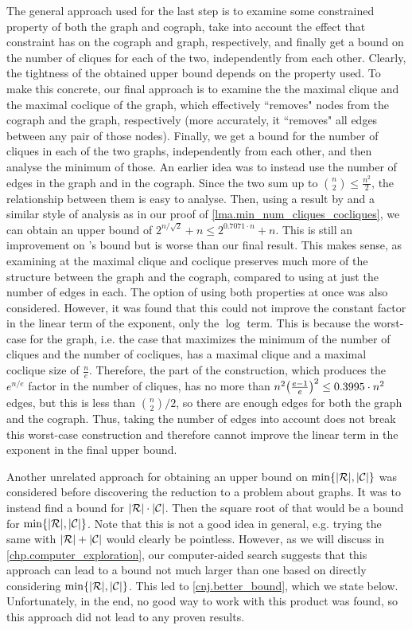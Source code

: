 \documentclass{report}
\DeclarePairedDelimiter{\set}{\{}{\}}
\DeclarePairedDelimiter{\abs}{\lvert}{\rvert}
\DeclarePairedDelimiter{\bracks}{(}{)}
\theoremstyle{definition}
\begin{document}
The general approach used for the last step is to examine some constrained property
of both the graph and cograph, take into account the effect that constraint has
on the cograph and graph, respectively, and finally get a bound on the number of
cliques for each of the two, independently from each other. Clearly, the tightness
of the obtained upper bound depends on the property used. To make this concrete,
our final approach is to examine the the maximal clique and the maximal coclique
of the graph, which effectively ``removes" nodes from the cograph and the graph,
respectively (more accurately, it ``removes" all edges between any pair of those
nodes). Finally, we get a bound for the number of cliques in each of the two graphs,
independently from each other, and then analyse the minimum of those.
An earlier idea was to instead use the number of edges in the graph and in the
cograph. Since the two sum up to $\binom{n}{2} \leq \frac{n^2}{2}$, the relationship
between them is easy to analyse. Then, using a result by \cite{cliques_edges} and a
similar style of analysis as in our proof of \cref{lma.min_num_cliques_cocliques},
we can obtain an upper bound of $2^{n / \sqrt{2}} + n \leq 2^{0.7071 \cdot n} + n$.
This is still an improvement on \cite{UFA_UB}'s bound but is worse than our final
result. This makes sense, as examining at the maximal clique and coclique preserves
much more of the structure between the graph and the cograph, compared to using
at just the number of edges in each. The option of using both properties at once
was also considered. However, it was found that this could not improve the constant
factor in the linear term of the exponent, only the $\log$ term. This is because
the worst-case for the graph, i.e. the case that maximizes the minimum of the number
of cliques and the number of cocliques, has a maximal clique and a maximal coclique
size of $\frac{n}{e}$. Therefore, the part of the construction, which produces the
$e^{n / e}$ factor in the number of cliques, has no more than
$n^2 \bracks*{\frac{e - 1}{e}}^2 \leq 0.3995 \cdot n^2$ edges, but this is less than
$\binom{n}{2} / 2$, so there are enough edges for both the graph and the cograph.
Thus, taking the number of edges into account does not break this worst-case
construction and therefore cannot improve the linear term in the exponent in the
final upper bound.

Another unrelated approach for obtaining an upper bound on
$\min\set{\abs{\mathcal{R}}, \abs{\mathcal{C}}}$ was considered before discovering
the reduction to a problem about graphs. It was to instead find a bound for
$\abs{\mathcal{R}} \cdot \abs{\mathcal{C}}$. Then the square root of that would be a
bound for $\min\set{\abs{\mathcal{R}}, \abs{\mathcal{C}}}$. Note that this is not a
good idea in general, e.g. trying the same with
$\abs{\mathcal{R}} + \abs{\mathcal{C}}$ would clearly be pointless. However, as we
will discuss in \cref{chp.computer_exploration}, our computer-aided search suggests
that this approach can lead to a bound not much larger than one based on directly
considering $\min\set{\abs{\mathcal{R}}, \abs{\mathcal{C}}}$. This led to
\cref{cnj.better_bound}, which we state below. Unfortunately, in the end, no good
way to work with this product was found, so this approach did not lead to any proven
results.
\end{document}
